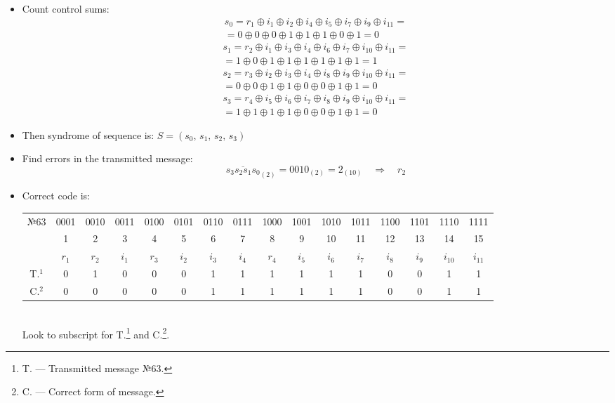 \documentclass[12pt]{article}
\begin{document}
	\begin{itemize}
		\item  Count control sums:
		\begin{multline*}
			s_{0} = r_{1}\oplus i_{1}\oplus i_{2}\oplus i_{4}\oplus i_{5}\oplus i_{7}\oplus i_{9}\oplus i_{11}=\\=0\oplus0\oplus0\oplus1\oplus1\oplus1\oplus0\oplus1=0
		\end{multline*}
		\begin{multline*}
			s_{1} = r_{2}\oplus i_{1}\oplus i_{3}\oplus i_{4}\oplus i_{6}\oplus i_{7}\oplus i_{10}\oplus i_{11}=\\=1\oplus0\oplus1\oplus1\oplus1\oplus1\oplus1\oplus1=1
		\end{multline*}
		\begin{multline*}
			s_{2} = r_{3}\oplus i_{2}\oplus i_{3}\oplus i_{4}\oplus i_{8}\oplus i_{9}\oplus i_{10}\oplus i_{11}=\\=0\oplus0\oplus1\oplus1\oplus0\oplus0\oplus1\oplus1=0
		\end{multline*}
		\begin{multline*}
			s_{3} = r_{4}\oplus i_{5}\oplus i_{6}\oplus i_{7}\oplus i_{8}\oplus i_{9}\oplus i_{10}\oplus i_{11}=\\=1\oplus1\oplus1\oplus1\oplus0\oplus0\oplus1\oplus1=0
		\end{multline*}
		\item Then syndrome of sequence is: \(S = (s_{0},\,s_{1},\,s_{2},\,s_{3})\)
		\item Find errors in the transmitted message: \[\overline{s_{3}s_{2}s_{1}s_{0}}_{(2)} = 0010_{(2)}=2_{(10)} \quad \Rightarrow \quad r_{2}\]
		\item Correct code is:
		\begin{table}[h!]
			\hspace*{-3cm}
			\begin{tabular}{ |c|c|c|c|c|c|c|c|c|c|c|c|c|c|c|c| } 
				\hline
				\multirow{3}{4em}{\centering№63} & 0001 & 0010 & 0011 & 0100 & 0101 & 0110 & 0111 & 1000 & 1001 & 1010 & 1011 & 1100 & 1101 & 1110 & 1111 \\
				& 1 & 2 & 3 & 4 & 5 & 6 & 7 & 8 & 9 & 10 & 11 & 12 & 13 & 14 & 15\\ 
				& \(r_{1}\) & \(r_{2}\) & \(i_{1}\) & \(r_{3}\) & \(i_{2}\) & \(i_{3}\) & \(i_{4}\) & \(r_{4}\) & \(i_{5}\) & \(i_{6}\) & \(i_{7}\) & \(i_{8}\) & \(i_{9}\) & \(i_{10}\) & \(i_{11}\)\\
				\hline 
				T.\(^{1}\) & 0 & 1 & 0 & 0 & 0 & 1 & 1 & 1 & 1 & 1 & 1 & 0 & 0 & 1 & 1\\ 
				\hline
				C.\(^{2}\) & 0 & 0 & 0 & 0 & 0 & 1 & 1 & 1 & 1 & 1 & 1 & 0 & 0 & 1 & 1\\ 
				\hline
			\end{tabular}
		\end{table}\\
		Look to subscript for T.\footnote{T. --- Transmitted message №63.} and C.\footnote{C. --- Correct form of message.}.
	\end{itemize}
	\newpage
\end{document}

